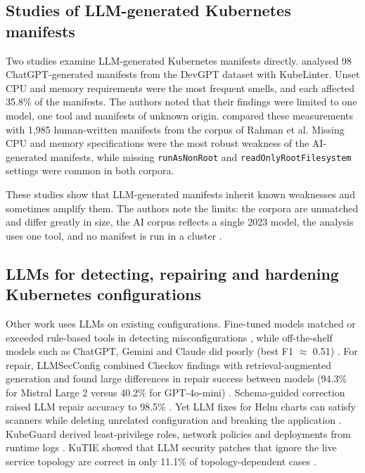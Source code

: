 \subsection{Studies of LLM-generated Kubernetes manifests}\label{sec:lit-llmk8s}

Two studies examine LLM-generated Kubernetes manifests directly. \citet{zhang2024genaismells} analysed 98 ChatGPT-generated manifests from the DevGPT dataset with KubeLinter. Unset CPU and memory requirements were the most frequent smells, and each affected 35.8\% of the manifests. The authors noted that their findings were limited to one model, one tool and manifests of unknown origin. \citet{jcomsec2026aivshumank8s} compared these measurements with 1,985 human-written manifests from the corpus of Rahman et al. Missing CPU and memory specifications were the most robust weakness of the AI-generated manifests, while missing \texttt{runAsNonRoot} and \texttt{readOnlyRootFilesystem} settings were common in both corpora.

These studies show that LLM-generated manifests inherit known weaknesses and sometimes amplify them. The authors note the limits: the corpora are unmatched and differ greatly in size, the AI corpus reflects a single 2023 model, the analysis uses one tool, and no manifest is run in a cluster \citep{jcomsec2026aivshumank8s}.

\subsection{LLMs for detecting, repairing and hardening Kubernetes configurations}\label{sec:lit-llmsec}

Other work uses LLMs on existing configurations. Fine-tuned models matched or exceeded rule-based tools in detecting misconfigurations \citep{malul2024genkubesec,ghorab2025k8sllm}, while off-the-shelf models such as ChatGPT, Gemini and Claude did poorly (best F1 $\approx$ 0.51) \citep{malul2024genkubesec}. For repair, LLMSecConfig combined Checkov findings with retrieval-augmented generation and found large differences in repair success between models (94.3\% for Mistral Large 2 versus 40.2\% for GPT-4o-mini) \citep{ye2025llmsecconfig}. Schema-guided correction raised LLM repair accuracy to 98.5\% \citep{ghorab2026inthewild}. Yet LLM fixes for Helm charts can satisfy scanners while deleting unrelated configuration and breaking the application \citep{minna2025helm}. KubeGuard derived least-privilege roles, network policies and deployments from runtime logs \citep{sgancohen2025kubeguard}. KuTIE showed that LLM security patches that ignore the live service topology are correct in only 11.1\% of topology-dependent cases \citep{shaikh2026kutie}.

